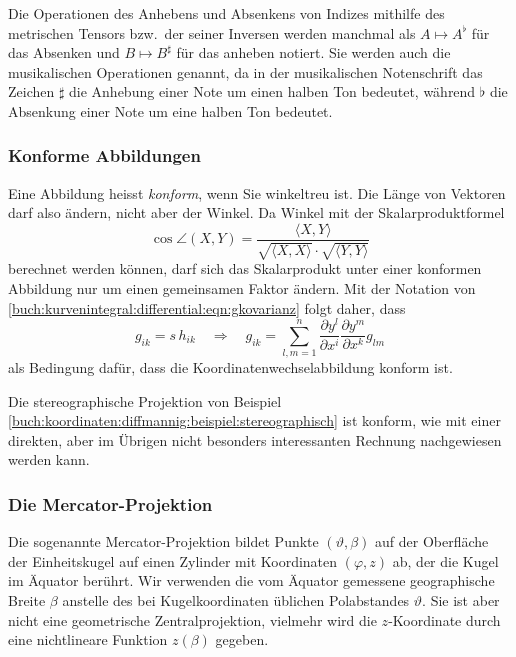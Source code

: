 Die Operationen des Anhebens und Absenkens von Indizes mithilfe
des metrischen Tensors bzw.~der seiner Inversen werden manchmal
als $A\mapsto A^\flat$ für das Absenken und $B\mapsto B^\sharp$
für das anheben notiert.
Sie werden auch die musikalischen Operationen genannt, da
in der musikalischen Notenschrift das Zeichen $\sharp$ die
Anhebung einer Note um einen halben Ton bedeutet, während
$\flat$ die Absenkung einer Note um eine halben Ton bedeutet.

%
%
\subsubsection{Konforme Abbildungen}
Eine Abbildung heisst {\em konform}, wenn Sie winkeltreu ist.
Die Länge von Vektoren darf also ändern, nicht aber der Winkel.
Da Winkel mit der Skalarproduktformel
\[
\cos \angle(X,Y)
=
\frac{
\langle X,Y \rangle
}{
\!\sqrt{\langle X, X\rangle}\cdot\!\sqrt{\langle Y,Y\rangle}
}
\]
berechnet werden können, darf sich das Skalarprodukt unter einer
konformen Abbildung nur um einen gemeinsamen Faktor ändern.
Mit der Notation von
\eqref{buch:kurvenintegral:differential:eqn:gkovarianz}
folgt daher, dass
\[
g_{ik} = s\,h_{ik}
\quad\Rightarrow\quad
g_{ik}
=
\sum_{l,m=1}^n
\frac{\partial y^l}{\partial x^i}
\frac{\partial y^m}{\partial x^k}
g_{lm}
\]
als Bedingung dafür, dass die Koordinatenwechselabbildung
konform ist.

\begin{beispiel}
Die stereographische Projektion von Beispiel 
\ref{buch:koordinaten:diffmannig:beispiel:stereographisch}
ist konform, wie mit einer direkten, aber im Übrigen nicht
besonders interessanten Rechnung nachgewiesen werden kann.
\end{beispiel}

%
%
\subsubsection{Die Mercator-Projektion}
Die sogenannte Mercator-Projektion bildet Punkte $(\vartheta,\beta)$
%
auf der Oberfläche der Einheitskugel auf einen Zylinder mit Koordinaten
$(\varphi,z)$ ab, der die Kugel im Äquator berührt.
%
Wir verwenden die vom Äquator gemessene geographische Breite $\beta$
%
anstelle des bei Kugelkoordinaten üblichen Polabstandes $\vartheta$.
Sie ist aber nicht eine geometrische Zentralprojektion, vielmehr wird die
$z$-Koordinate durch eine nichtlineare Funktion $z(\beta)$
gegeben.

